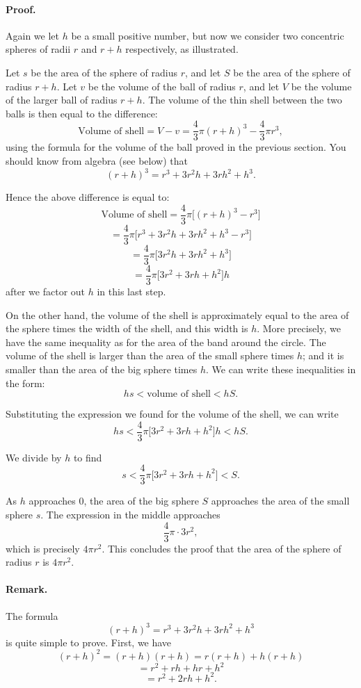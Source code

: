 \documentclass[12pt]{book} %
\begin{document}
\paragraph{Proof.}
Again we let $h$ be a small positive number, but now we consider two concentric spheres of radii $r$ and $r+h$ respectively, as illustrated.


Let $s$ be the area of the sphere of radius $r$, and let $S$ be the area of the sphere of radius $r+h$. Let $v$ be the volume of the ball of radius $r$, and let $V$ be the volume of the larger ball of radius $r+h$. The volume of the thin shell between the two balls is then equal to the difference:
\[
\text{Volume of shell}=V-v=\frac43\pi(r+h)^3-\frac43\pi r^3,
\]
using the formula for the volume of the ball proved in the previous section. You should know from algebra (see below) that
\[
(r+h)^3=r^3+3r^2h+3rh^2+h^3.
\]

Hence the above difference is equal to:
\[
\text{Volume of shell}
=\frac43\pi\big[(r+h)^3-r^3\big]
\]
\[
=\frac43\pi\big[r^3+3r^2h+3rh^2+h^3-r^3\big]
\]
\[
=\frac43\pi\big[3r^2h+3rh^2+h^3\big]
\]
\[
=\frac43\pi\big[3r^2+3rh+h^2\big]h
\]
after we factor out $h$ in this last step.

On the other hand, the volume of the shell is approximately equal to the area of the sphere times the width of the shell, and this width is $h$. More precisely, we have the same inequality as for the area of the band around the circle. The volume of the shell is larger than the area of the small sphere times $h$; and it is smaller than the area of the big sphere times $h$. We can write these inequalities in the form:
\[
hs<\text{volume of shell}<hS.
\]

Substituting the expression we found for the volume of the shell, we can write
\[
hs<\frac43\pi\big[3r^2+3rh+h^2\big]h<hS.
\]

We divide by $h$ to find
\[
s<\frac43\pi\big[3r^2+3rh+h^2\big]<S.
\]

As $h$ approaches 0, the area of the big sphere $S$ approaches the area of the small sphere $s$. The expression in the middle approaches
\[
\frac43\pi\cdot 3r^2,
\]
which is precisely $4\pi r^2$. This concludes the proof that the area of the sphere of radius $r$ is $4\pi r^2$.

\paragraph{Remark.}
The formula
\[
(r+h)^3=r^3+3r^2h+3rh^2+h^3
\]
is quite simple to prove. First, we have
\[
(r+h)^2=(r+h)(r+h)=r(r+h)+h(r+h)
\]
\[
=r^2+rh+hr+h^2
\]
\[
=r^2+2rh+h^2.
\]
\end{document}
